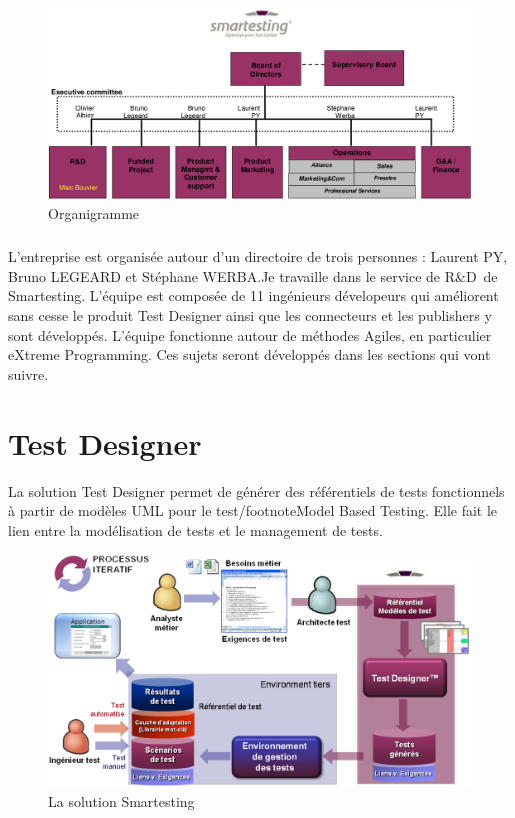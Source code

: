 \begin{figure}[!ht]
\centering
\includegraphics[width=\textwidth]{Illustrations/Organigramme_with_me.png}
\caption{Organigramme}
\label{figure:Organigramme de Smartesting}
\end{figure}

\subparagraph*{}
L'entreprise est organisée autour d'un directoire de trois personnes : Laurent PY, Bruno LEGEARD et Stéphane WERBA.Je travaille dans le service de R\&D{}\ de Smartesting.  L'équipe est composée de 11 ingénieurs dévelopeurs qui améliorent sans cesse le produit Test Designer ainsi que les connecteurs et les publishers y sont développés. L'équipe fonctionne autour de méthodes Agiles, en particulier eXtreme Programming. Ces sujets seront développés dans les sections qui vont suivre.

\pagebreak

\section{Test Designer}
La solution Test Designer permet de générer des référentiels de tests fonctionnels à partir de modèles UML pour le test/footnote{Model Based Testing}. Elle fait le lien entre la modélisation de tests et le management de tests.

\begin{figure}[!ht]
\centering
\includegraphics[width=\textwidth]{Illustrations/TheSolutionSmartesting.png}
\caption{La solution Smartesting}
\label{figure:La Solution Smartesting}
\end{figure}

